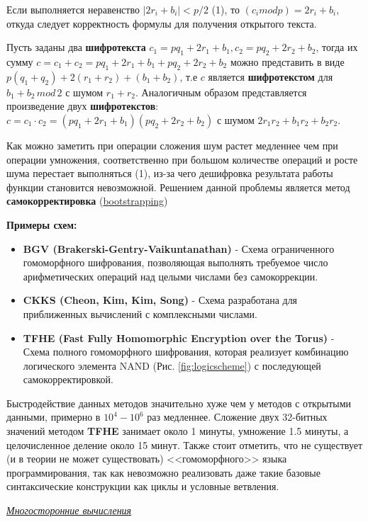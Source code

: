 Если выполняется неравенство $|2r_i+b_i| < p/2$ (1), то $(c_i mod p) = 2r_i + b_i$, откуда следует корректность формулы для получения открытого текста.

Пусть заданы два \textbf{шифротекста} $c_1 = pq_1+2r_1+b_1, c_2 = pq_2+2r_2+b_2$, тогда их сумму $c = c_1+c_2 = pq_1+2r_1+b_1 + pq_2+2r_2+b_2$ можно представить в виде $p(q_1+q_2) + 2(r_1+r_2) + (b_1 + b_2)$, т.е $c$ является \textbf{шифротекстом} для $b_1 + b_2 \, mod \, 2$ с шумом $r_1 + r_2$. Аналогичным образом представляется произведение двух \textbf{шифротекстов}: $c = c_1 \cdot c_2 = (pq_1+2r_1+b_1)(pq_2+2r_2+b_2)$ с шумом $2r_1r_2 + b_1r_2 + b_2r_2$.

Как можно заметить при операции сложения шум растет медленнее чем при операции умножения, соответственно при большом количестве операций и росте шума перестает выполняться (1), из-за чего дешифровка результата работы функции становится невозможной. Решением данной проблемы является метод \textbf{самокорректировка} (\href {https://eprint.iacr.org/2021/091.pdf}{bootstrapping})

\textbf{Примеры схем:}
\begin{itemize}
\item \textbf{BGV (Brakerski-Gentry-Vaikuntanathan)} - Схема ограниченного гомоморфного шифрования, позволяющая выполнять требуемое число арифметических операций над целыми числами без самокоррекции. 
\item \textbf{CKKS (Cheon, Kim, Kim, Song)} - Схема разработана для приближенных вычислений с комплексными числами.
\item \textbf{TFHE (Fast Fully Homomorphic Encryption over the Torus)} - Схема полного гомоморфного шифрования, которая реализует комбинацию логического элемента NAND (Рис. \ref{fig:logicscheme}) с последующей самокорректировкой. 
\end{itemize}

Быстродействие данных методов значительно хуже чем у методов с открытыми данными, примерно в $10^4-10^6$ раз медленнее. Сложение двух 32-битных значений методом \textbf{TFHE} занимает около 1 минуты, умножение 1.5 минуты, а целочисленное деление около 15 минут. Также стоит отметить, что не существует (и в теории не может существовать) <<гомоморфного>> языка программирования, так как невозможно реализовать даже такие базовые синтаксические конструкции как циклы и условные ветвления. 


\begin{center}
	\textit{\underline{Многосторонние вычисления}}
\end{center}


